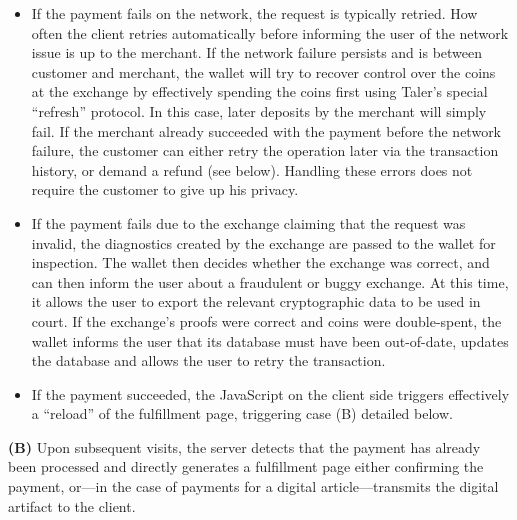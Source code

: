 \documentclass{IEEEtran}
\begin{document}
\begin{itemize}
\item If the payment fails on the network, the request is typically
 retried.  How often the client retries automatically before informing
 the user of the network issue is up to the merchant.  If the network
 failure persists and is between customer and merchant, the wallet
 will try to recover control over the coins at the exchange by
 effectively spending the coins first using Taler's special
 ``refresh'' protocol.  In this case, later deposits by the merchant
 will simply fail.  If the merchant already succeeded with the payment
 before the network failure, the customer can either retry the
 operation later via the transaction history, or demand a refund (see
 below).  Handling these errors does not require the customer to give
 up his privacy.
\item If the payment fails due to the exchange
 claiming that the request was invalid, the diagnostics created by the
 exchange are passed to the wallet for inspection.  The wallet then
 decides whether the exchange was correct, and can then inform the
 user about a fraudulent or buggy exchange.  At this time, it allows
 the user to export the relevant cryptographic data to be used in
 court.  If the exchange's proofs were correct and coins were
 double-spent, the wallet informs the user that its database must have
 been out-of-date, updates the database and allows the user to retry
 the transaction.
\item If the payment succeeded, the JavaScript on the
 client side triggers effectively a ``reload'' of the fulfillment
 page, triggering case (B) detailed below.
\end{itemize}

{\bf (B)} Upon subsequent visits, the server detects that the payment
has already been processed and directly generates a fulfillment page
either confirming the payment, or---in the case of payments for a
digital article---transmits the digital artifact to the client.
\end{document}
